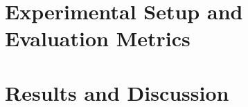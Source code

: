 \documentclass[sigconf,nonacm]{acmart}
\begin{document}

\section{Experimental Setup and Evaluation Metrics}


\section{Results and Discussion}



\end{document}
